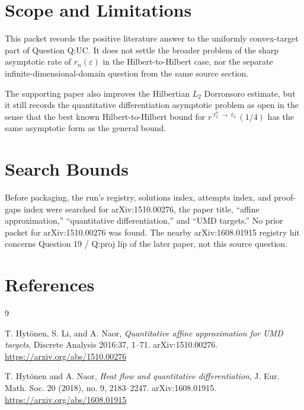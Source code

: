 \documentclass[11pt]{article}
\begin{document}
\section*{Scope and Limitations}

This packet records the positive literature answer to the uniformly
convex-target part of Question Q:UC. It does not settle the broader problem of
the sharp asymptotic rate of \(r_n(\varepsilon)\) in the Hilbert-to-Hilbert
case, nor the separate infinite-dimensional-domain question from the same
source section.

The supporting paper also improves the Hilbertian \(L_2\) Dorronsoro estimate,
but it still records the quantitative differentiation asymptotic problem as
open in the sense that the best known Hilbert-to-Hilbert bound for
\(r^{\ell_2^n\to\ell_2}(1/4)\) has the same asymptotic form as the general
bound.

\section*{Search Bounds}

Before packaging, the run's registry, solutions index, attempts index, and
proof-gaps index were searched for arXiv:1510.00276, the paper title,
``affine approximation,'' ``quantitative differentiation,'' and ``UMD targets.''
No prior packet for arXiv:1510.00276 was found. The nearby arXiv:1608.01915
registry hit concerns Question 19 / Q:proj lip of the later paper, not this
source question.

\section*{References}

\begin{thebibliography}{9}

T. Hytönen, S. Li, and A. Naor,
\emph{Quantitative affine approximation for UMD targets},
Discrete Analysis 2016:37, 1--71.
arXiv:1510.00276.
\url{https://arxiv.org/abs/1510.00276}

T. Hytönen and A. Naor,
\emph{Heat flow and quantitative differentiation},
J. Eur. Math. Soc. 20 (2018), no. 9, 2183--2247.
arXiv:1608.01915.
\url{https://arxiv.org/abs/1608.01915}

\end{thebibliography}
\end{document}
